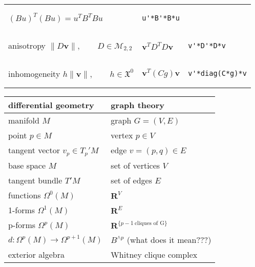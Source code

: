\documentclass{article}
\def\R{\mathbf{R}}
\begin{document}
\begin{tabular}{l|l|b{}}
$(Bu)^T(Bu)=u^TB^TBu$ &
\begin{verbatim}
u'*B'*B*u
\end{verbatim}
\\
anisotropy $\|D\mathbf{v}\|,\qquad D\in\mathcal{M}_{2,2}$ &
$\mathbf{v}^TD^TD\mathbf{v}$ &
\begin{verbatim}
v'*D'*D*v
\end{verbatim}
\\
inhomogeneity $h\|\mathbf{v}\|,\qquad h\in\mathfrak{X}^0$ &
$\mathbf{v}^T(Cg)\mathbf{v}$ &
\begin{verbatim}
v'*diag(C*g)*v
\end{verbatim}
\\
\end{tabular}

\bigskip

\begin{tabular}{l|l}
\bf differential geometry & \bf graph theory \\
\hline
manifold $M$ & graph $G=(V,E)$
\\
point $p\in M$ &
vertex $p\in V$
\\
tangent vector $v_p\in T_p'M$ &
edge $v=(p,q)\in E$
\\
	base space $M$ & set of vertices $V$ \\
	tangent bundle $T'M$ & set of edges $E$ \\
	functions $\Omega^0(M)$ & $\R^V$ \\
	1-forms $\Omega^1(M)$ & $\R^E$ \\
	p-forms $\Omega^p(M)$ & $\R^{\{p-1\ \textrm{cliques of G}\}}$ \\
	$d:\Omega^p(M)\to\Omega^{p+1}(M)$ & $B^{\wedge p}$ {\color{gray}(what does it mean???}) \\
	exterior algebra & Whitney clique complex \\
\end{tabular}
\end{document}
